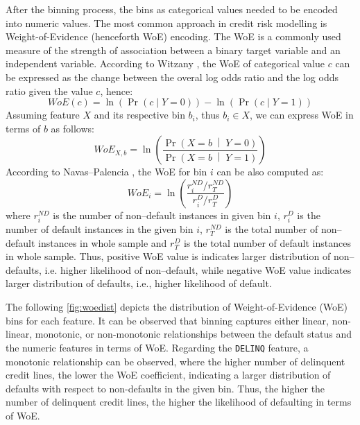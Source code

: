 After the binning process, the bins as categorical values needed to be encoded into numeric values. The most common approach in credit risk modelling is Weight-of-Evidence (henceforth WoE) encoding. The WoE is a commonly used measure of the strength of association between a binary target variable and an independent variable.
According to Witzany \citep{witzany2017credit}, the WoE of categorical value $c$ can be expressed as the change between the overal log odds ratio and the log odds ratio given the value $c$, hence:
\begin{equation}\label{eq}
    WoE\left(c\right) = \ln\left(\operatorname{Pr}\left(c \mid Y = 0 \right) \right) - \ln\left(\operatorname{Pr}\left(c \mid Y = 1 \right) \right)
\end{equation}
Assuming feature $X$ and its respective bin $b_i$, thus $b_i \in X$, we can express WoE in terms of $b$ as follows:
\begin{equation}\label{eq}
    WoE_{X, b}= \ln \left(\frac{\Pr{\left(X = b\;\middle|\;Y = 0\right)}}{\Pr{\left(X = b\;\middle|\;Y = 1\right)}}\right)
\end{equation}
According to Navas--Palencia \citep{navas2020optimal}, the WoE for bin $i$ can be also computed as:
\begin{equation}\label{eq}
    WoE_{i} = \ln \left( \frac{r^{ND}_i / r^{ND}_T} {r^{D}_i / r^{D}_T}  \right)
\end{equation}
where $r^{ND}_i$ is the number of non--default instances in given bin $i$, $r^{D}_i$ is the number of default instances in the given bin $i$, $r^{ND}_T$ is the total number of non--default instances in whole sample and $r^{D}_T$ is the total number of default instances in whole sample.
Thus, positive WoE value is indicates larger distribution of non--defaults, i.e. higher likelihood of non--default, while negative WoE value indicates larger distribution of defaults, i.e., higher likelihood of default. 

The following \autoref{fig:woedist} depicts the distribution of Weight-of-Evidence (WoE) bins for each feature. It can be observed that binning captures either linear, non-linear, monotonic, or non-monotonic relationships between the default status and the numeric features in terms of WoE.
Regarding the \texttt{DELINQ} feature, a monotonic relationship can be observed, where the higher number of delinquent credit lines, the lower the WoE coefficient, indicating a larger distribution of defaults with respect to non-defaults in the given bin.
Thus, the higher the number of delinquent credit lines, the higher the likelihood of defaulting in terms of WoE.

